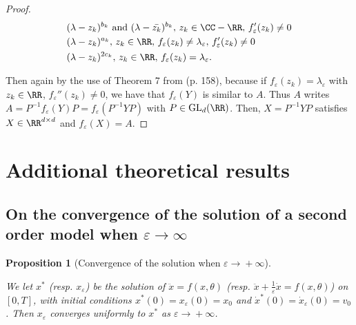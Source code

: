 \documentclass{article}
\newtheorem{proposition}{Proposition}
\begin{document}
\begin{proof}
\begin{equation*}
    \begin{split}
         & (\lambda - z_k)^{b_k} \text{ and } (\lambda - \bar{z_k})^{b_k}  ,\, z_k \in \CC -\RR, \, f_{\varepsilon}'(z_k)\neq 0 \\
         &(\lambda - z_k)^{a_k}  ,\, z_k \in \RR ,\, f_{\varepsilon}(z_k)\neq\lambda_{\varepsilon}, \,f_{\varepsilon}'(z_k)\neq 0 \\
         &(\lambda - z_k)^{2c_k}  ,\, z_k \in \RR,\, f_{\varepsilon}(z_k) = \lambda_{\varepsilon}.
    \end{split}
\end{equation*}

 Then again by the use of Theorem 7 from \citet{gant} (p. 158), because if $f_{\varepsilon}(z_k) = \lambda_{\varepsilon}$ with $z_k \in \RR$, $f_{\varepsilon}''(z_k) \neq 0$, we have that $f_{\varepsilon}(Y)$ is similar to $A$. 
 Thus $A$ writes $A = P^{-1}f_{\varepsilon}(Y)P = f_{\varepsilon}(P^{-1}YP)$ with $P \in \mathrm{GL}_d(\RR)$. 
 Then, $X = P^{-1}YP$ satisfies $X \in \RR^{d\times d}$ and $f_{\varepsilon}(X) = A$.
\end{proof}

\section{Additional theoretical results}\label{app:additional_results}

\subsection{On the convergence of the solution of a second order model when $\varepsilon \to \infty$}\label{app:prop_eps_infty}
\begin{proposition}[Convergence of the solution when $\varepsilon \xrightarrow{} + \infty$]\label{prop:eps_infty}

We let $x^*$ (resp. $x_{\varepsilon}$) be the solution of $\ddot{x} = f(x,\theta)$ (resp. $\ddot{x} + \frac{1}{\varepsilon} \dot{x} = f(x,\theta)$) on $[0,T]$, with initial conditions $x^*(0) = x_{\varepsilon}(0)=x_0$ and $\dot{x}^*(0) = \dot{x}_{\varepsilon}(0) = v_0$.
Then $x_{\varepsilon}$ converges uniformly to $x^*$ as $\varepsilon \xrightarrow{} + \infty$. 
\end{proposition}
\end{document}
